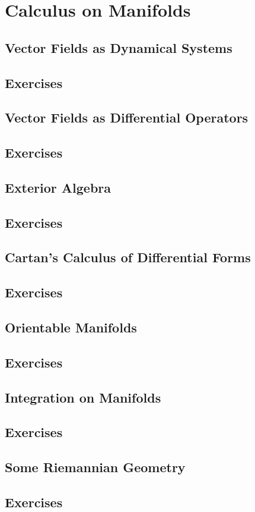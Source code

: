 \chapter{Calculus on Manifolds}
\section{Vector Fields as Dynamical Systems}
\section*{Exercises}
\section{Vector Fields as Differential Operators}
\section*{Exercises}
\section{Exterior Algebra}
\section*{Exercises}
\section{Cartan's Calculus of Differential Forms}
\section*{Exercises}
\section{Orientable Manifolds}
\section*{Exercises}
\section{Integration on Manifolds}
\section*{Exercises}
\section{Some Riemannian Geometry}
\section*{Exercises}

